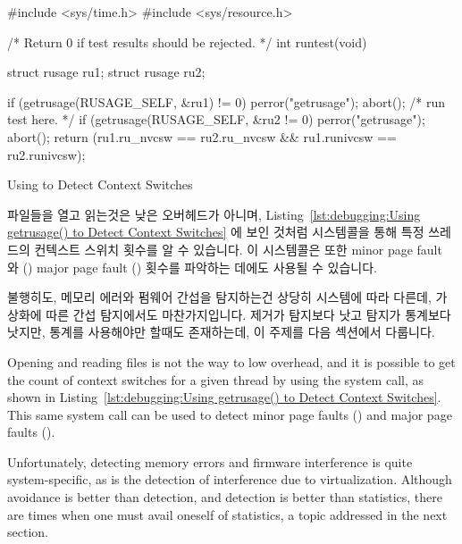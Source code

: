 \fi

\begin{listing}[tb]
\begin{fcvlabel}
\begin{VerbatimL}
#include <sys/time.h>
#include <sys/resource.h>

/* Return 0 if test results should be rejected. */
int runtest(void)
{
	struct rusage ru1;
	struct rusage ru2;

	if (getrusage(RUSAGE_SELF, &ru1) != 0) {
		perror("getrusage");
		abort();
	}
	/* run test here. */
	if (getrusage(RUSAGE_SELF, &ru2 != 0) {
		perror("getrusage");
		abort();
	}
	return (ru1.ru_nvcsw == ru2.ru_nvcsw &&
	        ru1.runivcsw == ru2.runivcsw);
}
\end{VerbatimL}
\end{fcvlabel}
\caption{Using  to Detect Context Switches}
\label{lst:debugging:Using getrusage() to Detect Context Switches}
\end{listing}

파일들을 열고 읽는것은 낮은 오버헤드가 아니며,
Listing~\ref{lst:debugging:Using getrusage() to Detect Context Switches}
에 보인 것처럼  시스템콜을 통해 특정 쓰레드의 컨텍스트 스위치
횟수를 알 수 있습니다.
이 시스템콜은 또한 minor page fault 와 () major page fault
() 횟수를 파악하는 데에도 사용될 수 있습니다.

불행히도, 메모리 에러와 펌웨어 간섭을 탐지하는건 상당히 시스템에 따라 다른데,
가상화에 따른 간섭 탐지에서도 마찬가지입니다.
제거가 탐지보다 낫고 탐지가 통계보다 낫지만, 통계를 사용해야만 할때도
존재하는데, 이 주제를 다음 섹션에서 다룹니다.

\iffalse

Opening and reading files is not the way to low overhead, and it is
possible to get the count of context switches for a given thread
by using the  system call, as shown in
Listing~\ref{lst:debugging:Using getrusage() to Detect Context Switches}.
This same system call can be used to detect minor page faults ()
and major page faults ().

Unfortunately, detecting memory errors and firmware interference is quite
system-specific, as is the detection of interference due to virtualization.
Although avoidance is better than detection, and detection is better than
statistics, there are times when one must avail oneself of statistics,
a topic addressed in the next section.

